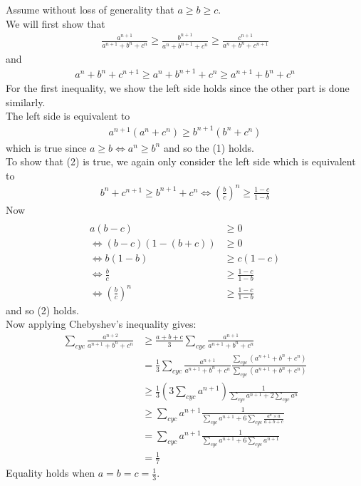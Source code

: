 \documentclass{article}
\begin{document}
\begin{enumerate}
Assume without loss of generality that $a \geq b \geq c$.
\\ We will first show that 
\begin{align} 
\frac{a^{n+1}}{a^{n+1}+b^{n}+c^{n}} \geq \frac{b^{n+1}}{a^{n}+b^{n+1}+c^{n}} \geq \frac{c^{n+1}}{a^{n}+b^{n}+c^{n+1}}
\end{align}
and 
\begin{align}
a^{n}+b^{n}+c^{n+1} \geq a^{n}+b^{n+1}+c^{n} \geq a^{n+1}+b^{n}+c^{n}
\end{align}
For the first inequality, we show the left side holds since the other part is done similarly.
\\ The left side is equivalent to
\begin{align*}
 a^{n+1}(a^{n}+c^{n}) \geq b^{n+1}(b^{n}+c^{n})
\end{align*}
which is true since $a \geq b \iff a^{n} \geq b^{n}$ and so the (1) holds. 
\\ To show that (2) is true, we again only consider the left side which is equivalent to 
\begin{align*}
b^{n}+c^{n+1} \geq b^{n+1}+c^{n}
\iff (\frac{b}{c})^{n} \geq \frac{1-c}{1-b}
\end{align*}
Now
\begin{align*}
\\a(b-c)&\geq 0 
\\ \iff (b-c)(1-(b+c))&\geq 0
\\ \iff b(1-b)&\geq c(1-c) 
\\ \iff \frac{b}{c} &\geq \frac{1-c}{1-b}
\\ \iff (\frac{b}{c})^{n} &\geq \frac{1-c}{1-b}
\end{align*}
and so (2) holds.
\\Now applying Chebyshev's inequality gives:
\begin{align*} 
\sum_{cyc}\frac{a^{n+2}}{a^{n+1}+b^{n}+c^{n}} &\geq \frac{a+b+c}{3}\sum_{cyc}\frac{a^{n+1}}{a^{n+1}+b^{n}+c^{n}} \\ &=\frac{1}{3}\sum_{cyc}\frac{a^{n+1}}{a^{n+1}+b^{n}+c^{n}}\frac{\sum_{cyc}(a^{n+1}+b^{n}+c^{n})}{\sum_{cyc}(a^{n+1}+b^{n}+c^{n})}\\
&\geq \frac{1}{3}(3\sum_{cyc}a^{n+1})\frac{1}{\sum_{cyc}a^{n+1}+2\sum_{cyc}a^{n}}\\
&\geq \sum_{cyc}a^{n+1}\frac{1}{\sum_{cyc}a^{n+1}+6\sum_{cyc}\frac{a^{n}\times a}{a+b+c}} \\
&= \sum_{cyc}a^{n+1}\frac{1}{\sum_{cyc}a^{n+1}+6\sum_{cyc}a^{n+1}}
\\&=\frac{1}{7}
\end{align*}
Equality holds when $a=b=c=\frac{1}{3}$.

\end{enumerate}
\end{document}
